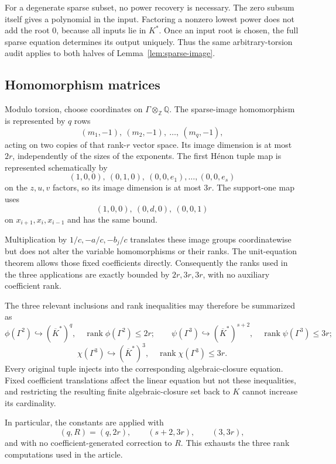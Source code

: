 \documentclass[11pt]{article}
\theoremstyle{definition}
\begin{document}
For a degenerate sparse subset, no power recovery is necessary. The zero subsum itself gives a polynomial in the input. Factoring a nonzero lowest power does not add the root \(0\), because all inputs lie in \(K^*\). Once an input root is chosen, the full sparse equation determines its output uniquely. Thus the same arbitrary-torsion audit applies to both halves of Lemma~\ref{lem:sparse-image}.


\subsection*{Homomorphism matrices}

Modulo torsion, choose coordinates on \(\Gamma\otimes_{\mathbb Z}\mathbb Q\). The sparse-image homomorphism is represented by \(q\) rows
\[
 (m_1,-1),\ (m_2,-1),\ \ldots,\ (m_q,-1),
\]
acting on two copies of that rank-\(r\) vector space. Its image dimension is at most \(2r\), independently of the sizes of the exponents. The first Hénon tuple map is represented schematically by
\[
 (1,0,0),\ (0,1,0),\
 (0,0,e_1),\ldots,(0,0,e_s)
\]
on the \(z,u,v\) factors, so its image dimension is at most \(3r\). The support-one map uses
\[
 (1,0,0),\ (0,d,0),\ (0,0,1)
\]
on \(x_{i+1},x_i,x_{i-1}\) and has the same bound.

Multiplication by \(1/c,-a/c,-b_j/c\) translates these image groups coordinatewise but does not alter the variable homomorphisms or their ranks. The unit-equation theorem allows those fixed coefficients directly. Consequently the ranks used in the three applications are exactly bounded by \(2r,3r,3r\), with no auxiliary coefficient rank.


The three relevant inclusions and rank inequalities may therefore be summarized as
\[
 \phi(\Gamma^2)\hookrightarrow(\overline K^*)^q,
 \quad \operatorname{rank}\phi(\Gamma^2)\leq2r;
 \qquad
 \psi(\Gamma^3)\hookrightarrow(\overline K^*)^{s+2},
 \quad \operatorname{rank}\psi(\Gamma^3)\leq3r;
\]
\[
 \chi(\Gamma^3)\hookrightarrow(\overline K^*)^3,
 \quad \operatorname{rank}\chi(\Gamma^3)\leq3r.
\]
Every original tuple injects into the corresponding algebraic-closure equation. Fixed coefficient translations affect the linear equation but not these inequalities, and restricting the resulting finite algebraic-closure set back to \(K\) cannot increase its cardinality.


In particular, the constants are applied with
\[
 (q,R)=(q,2r),\qquad (s+2,3r),\qquad (3,3r),
\]
and with no coefficient-generated correction to \(R\).
This exhausts the three rank computations used in the article.
\end{document}
